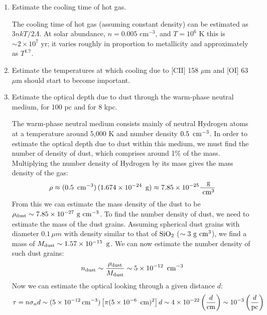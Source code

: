 \begin{enumerate} 
\item Estimate the cooling time of hot gas.
\begin{answer}
The cooling time of hot gas (assuming constant density) can be
estimated as $3nkT / 2 \Lambda$. At solar abundance, $n=0.005$
cm$^{-3}$, and $T=10^6$ K this is $\sim 2 \times 10^7$ yr; it varies
roughly in proportion to metallicity and approximately as $T^{1.7}$.
\end{answer}
\item Estimate the temperatures at which cooling due to [CII]
158 $\mu$m and [OI] 63 $\mu$m should start to become important.
\item Estimate the optical depth due to dust through the warm-phase neutral
medium, for 100 pc and for 8 kpc.
\begin{answer}
The warm-phase neutral medium consists mainly of neutral Hydrogen
atoms at a temperature around 5,000 K and number density $0.5 \, {\rm
~cm}^{-3}$. In order to estimate the optical depth due to dust within
this medium, we must find the number of density of dust, which
comprises around 1\% of the mass. Multiplying the number density of
Hydrogen by its mass gives the mass density of the gas:
\begin{equation}
\rho \approx (0.5 \, {\rm ~cm}^{-3}) \, (1.674\times10^{-24} \, {\rm
~g}) \approx 7.85\times10^{-25} \frac{{\rm ~g}}{{\rm ~cm}^3}
\end{equation}
From this we can estimate the mass density of the dust to be
$\rho_{\rm dust} \sim 7.85\times 10^{-27} {\rm ~g}{\rm ~cm}^{-3}$. To
find the number density of dust, we need to estimate the mass of the
dust grains. Assuming spherical dust grains with diameter $0.1 \, \mu
m$ with density similar to that of ${\rm SiO}_2$ ($\sim 3 {\rm ~g}{\rm
~cm}^3$), we find a mass of $M_{\rm dust} \sim 1.57\times10^{-15} \,
{\rm ~g}$. We can now estimate the number density of such dust grains:
\begin{equation}
n_{\rm dust} \sim \frac{\rho_{\rm dust}}{M_{\rm dust}} \sim 5\times
10^{-12} \, {\rm ~cm}^{-3}
\end{equation}
Now we can estimate the optical looking through a given
distance $d$:
\begin{equation}
\tau = n \sigma_n d \sim (5 \times 10^{-12} \, {\rm cm}^{-3})
\left[\pi (5\times10^{-6} \, {\rm ~cm})^2\right] d \sim
4\times 10^{-22} \left(\frac{d}{\rm cm}\right) \sim
10^{-3} \left(\frac{d}{\rm pc}\right)
\end{equation}

\end{answer}
\end{enumerate}
